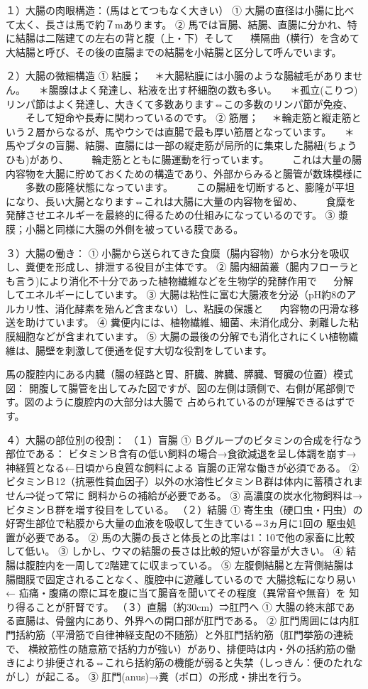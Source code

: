 １）大腸の肉眼構造：（馬はとてつもなく大きい）
① 大腸の直径は小腸に比べて太く、長さは馬で約７mあります。
② 馬では盲腸、結腸、直腸に分かれ、特に結腸は二階建ての左右の背と腹（上・下）そして
　 横隔曲（横行）を含めて大結腸と呼び、その後の直腸までの結腸を小結腸と区分して呼んでいます。

２）大腸の微細構造
① 粘膜；
　＊大腸粘膜には小腸のような腸絨毛がありません。
　＊腸腺はよく発達し、粘液を出す杯細胞の数も多い。
　＊孤立(こりつ)リンパ節はよく発達し、大きくて多数あります⇔この多数のリンパ節が免疫、
　　そして短命や長寿に関わっているのです。
② 筋層；
　＊輪走筋と縦走筋という２層からなるが、馬やウシでは直腸で最も厚い筋層となっています。
　＊馬やブタの盲腸、結腸、直腸には一部の縦走筋が局所的に集束した腸紐(ちょうひも)があり、
　　輪走筋とともに腸運動を行っています。
　　これは大量の腸内容物を大腸に貯めておくための構造であり、外部からみると腸管が数珠模様に
　　多数の膨隆状態になっています。
　　この腸紐を切断すると、膨隆が平坦になり、長い大腸となります⇔これは大腸に大量の内容物を留め、
　　食糜を発酵させエネルギーを最終的に得るための仕組みになっているのです。
③ 漿膜；小腸と同様に大腸の外側を被っている膜である。

３）大腸の働き：
① 小腸から送られてきた食糜（腸内容物）から水分を吸収し、糞便を形成し、排泄する役目が主体です。
② 腸内細菌叢（腸内フローラとも言う)により消化不十分であった植物繊維などを生物学的発酵作用で
　 分解してエネルギーにしています。
③ 大腸は粘性に富む大腸液を分泌（pH約8のアルカリ性、消化酵素を殆んど含まない）し、粘膜の保護と
　 内容物の円滑な移送を助けています。
④ 糞便内には、植物繊維、細菌、未消化成分、剥離した粘膜細胞などが含まれています。
⑤ 大腸の最後の分解でも消化されにくい植物繊維は、腸壁を刺激して便通を促す大切な役割をしています。

馬の腹腔内にある内臓（腸の経路と胃、肝臓、脾臓、膵臓、腎臓の位置）模式図：
開腹して腸管を出してみた図ですが、図の左側は頭側で、右側が尾部側です。図のように腹腔内の大部分は大腸で
占められているのが理解できるはずです。

４）大腸の部位別の役割：
（１）盲腸
① Ｂグループのビタミンの合成を行なう部位である：
ビタミンＢ含有の低い飼料の場合→食欲減退を呈し体調を崩す→神経質となる←日頃から良質な飼料による
盲腸の正常な働きが必須である。
② ビタミンＢ12（抗悪性貧血因子）以外の水溶性ビタミンＢ群は体内に蓄積されません⇒従って常に
飼料からの補給が必要である。
③ 高濃度の炭水化物飼料は→ビタミンＢ群を増す役目をしている。
（２）結腸
① 寄生虫（硬口虫・円虫）の好寄生部位で粘膜から大量の血液を吸収して生きている⇔3ヵ月に1回の
駆虫処置が必要である。
② 馬の大腸の長さと体長との比率は1：10で他の家畜に比較して低い。
③ しかし、ウマの結腸の長さは比較的短いが容量が大きい。
④ 結腸は腹腔内を一周して2階建てに収まっている。
⑤ 左腹側結腸と左背側結腸は腸間膜で固定されることなく、腹腔中に遊離しているので
大腸捻転になり易い← 疝痛・腹痛の際に耳を腹に当て腸音を聞いてその程度（異常音や無音）を
知り得ることが肝腎です。
（３）直腸（約30cm）⇒肛門へ
① 大腸の終末部である直腸は、骨盤内にあり、外界への開口部が肛門である。
② 肛門周囲には内肛門括約筋（平滑筋で自律神経支配の不随筋）と外肛門括約筋（肛門挙筋の連続で、
横紋筋性の随意筋で括約力が強い）があり、排便時は内・外の括約筋の働きにより排便される⇔これら括約筋の機能が弱ると失禁（しっきん：便のたれながし）が起こる。
③ 肛門(anus)→糞（ボロ）の形成・排出を行う。


